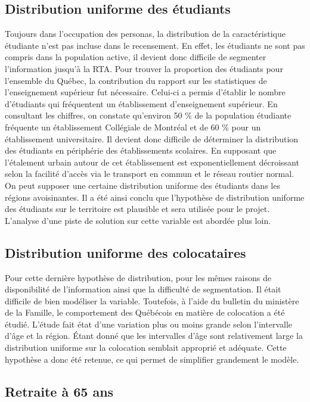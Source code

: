 \documentclass[11pt,french]{article}\usepackage[]{graphicx}\usepackage[]{color}
\begin{document}
\subsection*{Distribution uniforme des étudiants}

Toujours dans l'occupation des personas, la distribution de la caractéristique étudiante n'est pas incluse dans le recensement. En effet, les étudiants ne sont pas compris dans la population active, il devient donc difficile de segmenter l'information jusqu'à la RTA. Pour trouver la proportion des étudiants pour l'ensemble du Québec, la contribution du rapport sur les statistiques de l'enseignement supérieur fut nécessaire. Celui-ci a permis d'établir le nombre d'étudiants qui fréquentent un établissement d'enseignement supérieur. En consultant les chiffres, on constate qu'environ 50 \% de la population étudiante fréquente un établissement Collégiale de Montréal et de 60 \% pour un établissement universitaire. Il devient donc difficile de déterminer la distribution des étudiants en périphérie des établissements scolaires. En supposant que l'étalement urbain autour de cet établissement est exponentiellement décroissant selon la facilité d'accès via le transport en commun et le réseau routier normal. On peut supposer une certaine distribution uniforme des étudiants dans les régions avoisinantes. Il a été ainsi conclu que l'hypothèse de distribution uniforme des étudiants sur le territoire est plausible et sera utilisée pour le projet. L'analyse d'une piste de solution sur cette variable est abordée plus loin.

\subsection*{Distribution uniforme des colocataires}

Pour cette dernière hypothèse de distribution, pour les mêmes raisons de disponibilité de l'information ainsi que la difficulté de segmentation. Il était difficile de bien modéliser la variable. Toutefois, à l'aide du bulletin du ministère de la Famille, le comportement des Québécois en matière de colocation a été étudié. L'étude fait état d'une variation plus ou moins grande selon l'intervalle d'âge et la région. Étant donné que les intervalles d'âge sont relativement large la distribution uniforme sur la colocation semblait approprié et adéquate. Cette hypothèse a donc été retenue, ce qui permet de simplifier grandement le modèle. 

\subsection*{Retraite à 65 ans}
\end{document}
